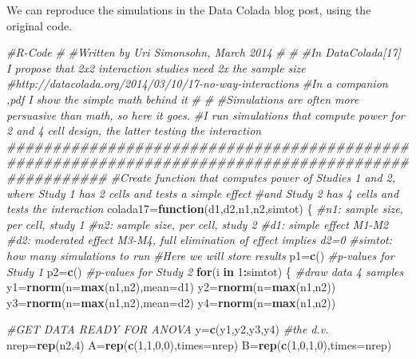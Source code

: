 \documentclass[]{book}
\newenvironment{Shaded}{\begin{snugshade}}{\end{snugshade}}
\newcommand{\CommentTok}[1]{\textcolor[rgb]{0.56,0.35,0.01}{\textit{#1}}}
\newcommand{\ControlFlowTok}[1]{\textcolor[rgb]{0.13,0.29,0.53}{\textbf{#1}}}
\newcommand{\DataTypeTok}[1]{\textcolor[rgb]{0.13,0.29,0.53}{#1}}
\newcommand{\DecValTok}[1]{\textcolor[rgb]{0.00,0.00,0.81}{#1}}
\newcommand{\KeywordTok}[1]{\textcolor[rgb]{0.13,0.29,0.53}{\textbf{#1}}}
\newcommand{\NormalTok}[1]{#1}
\newcommand{\OperatorTok}[1]{\textcolor[rgb]{0.81,0.36,0.00}{\textbf{#1}}}
\begin{document}
We can reproduce the simulations in the Data Colada blog post, using the original code.

\begin{Shaded}
\begin{Highlighting}[]
\CommentTok{#R-Code}
\CommentTok{#}
\CommentTok{#Written by Uri Simonsohn, March 2014}
\CommentTok{#}
\CommentTok{#}
\CommentTok{#In DataColada[17] I propose that 2x2 interaction studies need 2x the sample size}
\CommentTok{#http://datacolada.org/2014/03/10/17-no-way-interactions}
\CommentTok{#In a companion ,pdf I show the simple math behind it}
\CommentTok{#}
\CommentTok{#}
\CommentTok{#Simulations are often more persuasive than math, so here it goes.}
\CommentTok{#I run simulations that compute power for 2 and 4 cell design, the latter testing the interaction}
\CommentTok{###################################################################################################}
\CommentTok{#Create function that computes power of Studies 1 and 2, where Study 1  has 2 cells and tests a simple effect}
\CommentTok{#and Study 2 has 4 cells and tests the interaction}
\NormalTok{  colada17=}\ControlFlowTok{function}\NormalTok{(d1,d2,n1,n2,simtot)}
\NormalTok{  \{}
  \CommentTok{#n1: sample size, per cell, study 1}
  \CommentTok{#n2: sample size, per cell, study 2}
  \CommentTok{#d1: simple effect M1-M2}
  \CommentTok{#d2: moderated effect M3-M4, full elimination of effect implies d2=0}
  \CommentTok{#simtot: how many simulations to run}
  \CommentTok{#Here we will store results}
\NormalTok{      p1=}\KeywordTok{c}\NormalTok{()    }\CommentTok{#p-values for Study 1}
\NormalTok{      p2=}\KeywordTok{c}\NormalTok{()    }\CommentTok{#p-values for Study 2}
  \ControlFlowTok{for}\NormalTok{(i }\ControlFlowTok{in} \DecValTok{1}\OperatorTok{:}\NormalTok{simtot) \{}
    \CommentTok{#draw data 4 samples}
\NormalTok{    y1=}\KeywordTok{rnorm}\NormalTok{(}\DataTypeTok{n=}\KeywordTok{max}\NormalTok{(n1,n2),}\DataTypeTok{mean=}\NormalTok{d1)}
\NormalTok{    y2=}\KeywordTok{rnorm}\NormalTok{(}\DataTypeTok{n=}\KeywordTok{max}\NormalTok{(n1,n2))}
\NormalTok{    y3=}\KeywordTok{rnorm}\NormalTok{(}\DataTypeTok{n=}\KeywordTok{max}\NormalTok{(n1,n2),}\DataTypeTok{mean=}\NormalTok{d2)}
\NormalTok{    y4=}\KeywordTok{rnorm}\NormalTok{(}\DataTypeTok{n=}\KeywordTok{max}\NormalTok{(n1,n2))}
    
    \CommentTok{#GET DATA READY FOR ANOVA  }
\NormalTok{      y=}\KeywordTok{c}\NormalTok{(y1,y2,y3,y4)          }\CommentTok{#the d.v.}
\NormalTok{      nrep=}\KeywordTok{rep}\NormalTok{(n2,}\DecValTok{4}\NormalTok{)          }
\NormalTok{      A=}\KeywordTok{rep}\NormalTok{(}\KeywordTok{c}\NormalTok{(}\DecValTok{1}\NormalTok{,}\DecValTok{1}\NormalTok{,}\DecValTok{0}\NormalTok{,}\DecValTok{0}\NormalTok{),}\DataTypeTok{times=}\NormalTok{nrep) }
\NormalTok{      B=}\KeywordTok{rep}\NormalTok{(}\KeywordTok{c}\NormalTok{(}\DecValTok{1}\NormalTok{,}\DecValTok{0}\NormalTok{,}\DecValTok{1}\NormalTok{,}\DecValTok{0}\NormalTok{),}\DataTypeTok{times=}\NormalTok{nrep)}
    

\end{Highlighting}
\end{Shaded}
\end{document}

